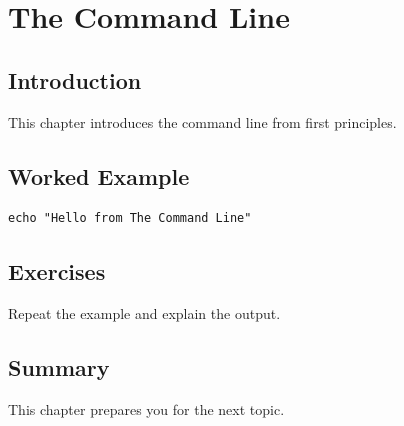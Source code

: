 \chapter{The Command Line}
\label{chap:34}
\section{Introduction}
This chapter introduces the command line from first principles.

\section{Worked Example}
\begin{lstlisting}
echo "Hello from The Command Line"
\end{lstlisting}

\section{Exercises}
\begin{exercise}
Repeat the example and explain the output.
\end{exercise}

\section{Summary}
This chapter prepares you for the next topic.
